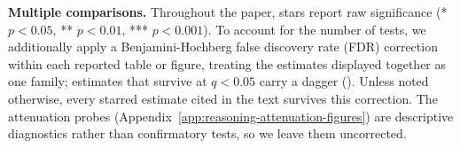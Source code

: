 \textbf{Multiple comparisons.} Throughout the paper, stars report raw significance (* $p<0.05$, ** $p<0.01$, *** $p<0.001$). To account for the number of tests, we additionally apply a Benjamini-Hochberg false discovery rate (FDR) correction within each reported table or figure, treating the estimates displayed together as one family; estimates that survive at $q < 0.05$ carry a dagger (\dag). Unless noted otherwise, every starred estimate cited in the text survives this correction. The attenuation probes (Appendix~\ref{app:reasoning-attenuation-figures}) are descriptive diagnostics rather than confirmatory tests, so we leave them uncorrected.
